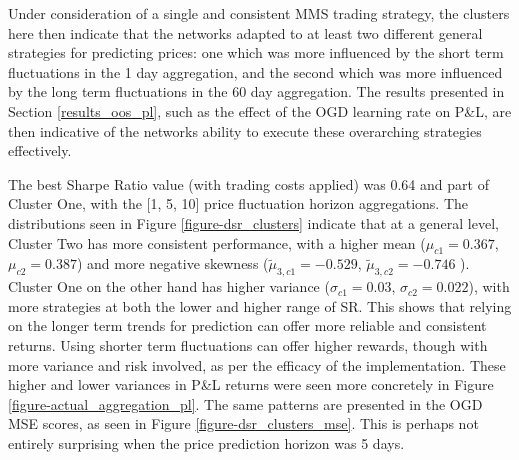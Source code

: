 \documentclass[a4paper,11pt,oneside]{article}
\theoremstyle{plain}
\theoremstyle{definition}
\begin{document}
	Under consideration of a single and consistent MMS trading strategy, the clusters here then indicate that the networks adapted to at least two different general strategies for predicting prices: one which was more influenced by the short term fluctuations in the 1 day aggregation, and the second which was more influenced by the long term fluctuations in the 60 day aggregation. The results presented in Section \ref{results_oos_pl}, such as the effect of the OGD learning rate on P\&L, are then indicative of the networks ability to execute these overarching strategies effectively. \newline
	
	The best Sharpe Ratio value (with trading costs applied) was 0.64 and part of Cluster One, with the [1, 5, 10] price fluctuation horizon aggregations. The distributions seen in Figure \ref{figure-dsr_clusters} indicate that at a general level, Cluster Two has more consistent performance, with a higher mean ($\mu_{c1} = 0.367$, $\mu_{c2} = 0.387$) and more negative skewness ($\tilde{\mu}_{3,c1} = -0.529$, $\tilde{\mu}_{3,c2} = -0.746$ ). Cluster One on the other hand has higher variance ($\sigma_{c1} = 0.03$, $\sigma_{c2} = 0.022$), with more strategies at both the lower and higher range of SR. This shows that relying on the longer term trends for prediction can offer more reliable and consistent returns. Using shorter term fluctuations can offer higher rewards, though with more variance and risk involved, as per the efficacy of the implementation. These higher and lower variances in P\&L returns were seen more concretely in Figure \ref{figure-actual_aggregation_pl}. The same patterns are presented in the OGD MSE scores, as seen in Figure \ref{figure-dsr_clusters_mse}. This is perhaps not entirely surprising when the price prediction horizon was 5 days.\newline
\end{document}
